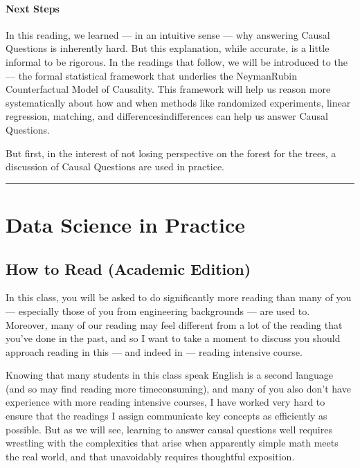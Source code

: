 \documentclass[letterpaper,10pt,english]{jupyterBook}
\begin{document}
\subsection{Next Steps}
\label{\detokenize{30_questions/40_answering_causal_questions:next-steps}}
\sphinxAtStartPar
In this reading, we learned — in an intuitive sense — why answering Causal Questions is inherently hard. But this explanation, while accurate, is a little informal to be rigorous. In the readings that follow, we will be introduced to the  — the formal statistical framework that underlies the Neyman\sphinxhyphen{}Rubin Counterfactual Model of Causality. This framework will help us reason more systematically about how and when methods like randomized experiments, linear regression, matching, and differences\sphinxhyphen{}in\sphinxhyphen{}differences can help us answer Causal Questions.

\sphinxAtStartPar
But first, in the interest of not losing perspective on the forest for the trees, a discussion of  Causal Questions are used in practice.


\bigskip\hrule\bigskip


\sphinxstepscope


\part{Data Science in Practice}

\sphinxstepscope


\chapter{How to Read (Academic Edition)}
\label{\detokenize{40_in_practice/00_how_to_read_this_book:how-to-read-academic-edition}}\label{\detokenize{40_in_practice/00_how_to_read_this_book::doc}}
\sphinxAtStartPar
In this class, you will be asked to do significantly more reading than many of you — especially those of you from engineering backgrounds — are used to. Moreover, many of our reading may feel different from a lot of the reading that you’ve done in the past, and so I want to take a moment to discuss  you should approach reading in this — and indeed in  — reading intensive course.

\sphinxAtStartPar
Knowing that many students in this class speak English is a second language (and so may find reading more time\sphinxhyphen{}consuming), and many of you also don’t have experience with more reading intensive courses, I have worked very hard to ensure that the readings I assign communicate key concepts as efficiently as possible. But as we will see, learning to answer causal questions well requires wrestling with the complexities that arise when apparently simple math meets the real world, and that unavoidably requires thoughtful exposition.
\end{document}
